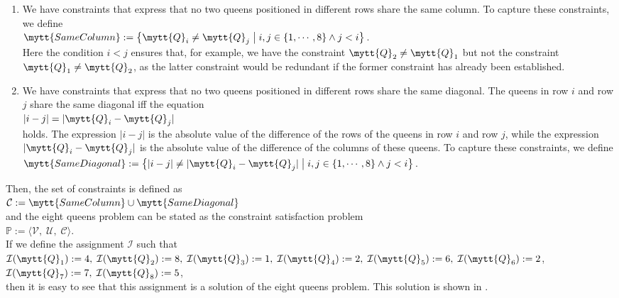 \begin{enumerate}
\item We have constraints that express that no two queens positioned in different rows share the same column.
      To capture these constraints, we define
      \\[0.2cm]
      \hspace*{1.3cm}
      $\mytt{SameColumn} := \bigl\{ \mytt{Q}_i \not= \mytt{Q}_j \bigm| i,j \in \{1,\cdots,8\} \wedge j < i \bigr\}$.
      \\[0.2cm]
      Here the condition $i < j$ ensures that, for example, we have the constraint $\mytt{Q}_2 \not= \mytt{Q}_1$
      but not the constraint  $\mytt{Q}_1 \not= \mytt{Q}_2$, as the latter constraint would be redundant if
      the former constraint has already been established.
\item We have constraints that express that no two queens positioned in different rows share the same 
      diagonal.  The queens in row $i$ and row $j$ share the same diagonal iff the equation
      \\[0.2cm]
      \hspace*{1.3cm}
      $|i - j| = |\mytt{Q}_i - \mytt{Q}_j|$
      \\[0.2cm]
      holds.  The expression $|i-j|$ is the absolute value of the difference of the rows of the queens in row
      $i$ and row $j$,  while the expression $|\mytt{Q}_i - \mytt{Q}_j|$ is the absolute value of the difference of the
      columns of these queens.  To capture these constraints, we define
      \\[0.2cm]
      \hspace*{1.3cm}
      $\mytt{SameDiagonal} := \bigl\{ |i  - j| \not= |\mytt{Q}_i - \mytt{Q}_j| \bigm| i,j \in \{1,\cdots,8\} \wedge j < i \bigr\}$.
\end{enumerate}
Then, the set of constraints is defined as 
\\[0.2cm]
\hspace*{1.3cm}
$\mathcal{C} := \mytt{SameColumn} \cup \mytt{SameDiagonal}$
\\[0.2cm]
and the eight queens problem can be stated as the constraint satisfaction problem
\\[0.2cm]
\hspace*{1.3cm}
$\mathbb{P} := \langle \mathcal{V},\; \mathcal{U},\; \mathcal{C} \rangle$.
\\[0.2cm]
If we define the assignment $\mathcal{I}$ such that
\\[0.2cm]
\hspace*{1.3cm}
$\mathcal{I}(\mytt{Q}_1) := 4,\; \mathcal{I}(\mytt{Q}_2) := 8,\; \mathcal{I}(\mytt{Q}_3) := 1,\;
\mathcal{I}(\mytt{Q}_4) := 2,\; \mathcal{I}(\mytt{Q}_5) := 6,\; \mathcal{I}(\mytt{Q}_6) := 2$,
\\[0.2cm]
\hspace*{1.3cm}
$\mathcal{I}(\mytt{Q}_7) := 7,\; \mathcal{I}(\mytt{Q}_8) := 5$,
\\[0.2cm]
then it is easy to see that this assignment is a solution of the eight queens problem.  This solution is shown
in .


